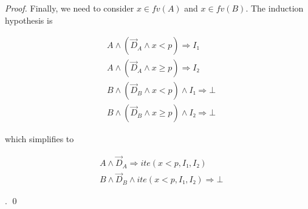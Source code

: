 \begin{proof}
Finally, we need to consider $x ∈ fv(A)$ and $x ∈ fv(B)$.
The induction hypothesis is\\
\parbox{0.38\linewidth}{
\begin{eqnarray*}
& A ∧ (\vec D_A ∧ x < p) ⇒ I₁ \\
& A ∧ (\vec D_A ∧ x ≥ p) ⇒ I₂ \\
& B ∧ (\vec D_B ∧ x < p) ∧ I₁ ⇒ ⊥ \\
& B ∧ (\vec D_B ∧ x ≥ p) ∧ I₂ ⇒ ⊥
\end{eqnarray*}
}
which simplifies to
\parbox{0.42\linewidth}{
\begin{eqnarray*}
& A ∧ \vec D_A ⇒ ite(x < p, I₁, I₂)\\
& B ∧ \vec D_B ∧ ite(x < p, I₁, I₂) ⇒ ⊥
\end{eqnarray*}
}.
\qed
\end{proof}

